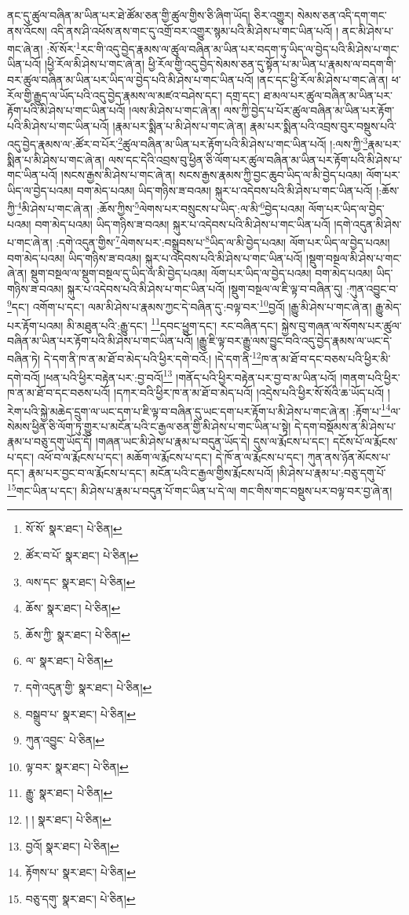 ནང་དུ་ཚུལ་བཞིན་མ་ཡིན་པར་ཐེ་ཚོམ་ཅན་གྱི་ཚུལ་གྱིས་ཅི་ཞིག་ཡོད། ཅིར་འགྱུར། སེམས་ཅན་འདི་དག་གང་ནས་འོངས། འདི་ནས་ཤི་འཕོས་ནས་གང་དུ་འགྲོ་བར་འགྱུར་སྙམ་པའི་མི་ཤེས་པ་གང་ཡིན་པའོ། །
ནང་མི་ཤེས་པ་གང་ཞེ་ན། :སོ་སོར་\footnote{སོ་སོ་  སྣར་ཐང་།  པེ་ཅིན། }རང་གི་འདུ་བྱེད་རྣམས་ལ་ཚུལ་བཞིན་མ་ཡིན་པར་བདག་ཏུ་ཡིད་ལ་བྱེད་པའི་མི་ཤེས་པ་གང་ཡིན་པའོ། །ཕྱི་རོལ་མི་ཤེས་པ་གང་ཞེ་ན། ཕྱི་རོལ་གྱི་འདུ་བྱེད་སེམས་ཅན་དུ་སྟོན་པ་མ་ཡིན་པ་རྣམས་ལ་བདག་གི་བར་ཚུལ་བཞིན་མ་ཡིན་པར་ཡིད་ལ་བྱེད་པའི་མི་ཤེས་པ་གང་ཡིན་པའོ། །ནང་དང་ཕྱི་རོལ་མི་ཤེས་པ་གང་ཞེ་ན། ཕ་རོལ་གྱི་རྒྱུད་ལ་ཡོད་པའི་འདུ་བྱེད་རྣམས་ལ་མཛའ་བཤེས་དང་། དགྲ་དང་། ཐ་མལ་པར་ཚུལ་བཞིན་མ་ཡིན་པར་རྟོག་པའི་མི་ཤེས་པ་གང་ཡིན་པའོ། །ལས་མི་ཤེས་པ་གང་ཞེ་ན། ལས་ཀྱི་བྱེད་པ་པོར་ཚུལ་བཞིན་མ་ཡིན་པར་རྟོག་པའི་མི་ཤེས་པ་གང་ཡིན་པའོ། །རྣམ་པར་སྨིན་པ་མི་ཤེས་པ་གང་ཞེ་ན། རྣམ་པར་སྨིན་པའི་འབྲས་བུར་བསྡུས་པའི་འདུ་བྱེད་རྣམས་ལ་:ཚོར་བ་པོར་\footnote{ཚོར་བ་པོ་  སྣར་ཐང་།  པེ་ཅིན། }ཚུལ་བཞིན་མ་ཡིན་པར་རྟོག་པའི་མི་ཤེས་པ་གང་ཡིན་པའོ། །:ལས་ཀྱི་\footnote{ལས་དང་  སྣར་ཐང་།  པེ་ཅིན། }རྣམ་པར་སྨིན་པ་མི་ཤེས་པ་གང་ཞེ་ན། ལས་དང་དེའི་འབྲས་བུ་ཕྱིན་ཅི་ལོག་པར་ཚུལ་བཞིན་མ་ཡིན་པར་རྟོག་པའི་མི་ཤེས་པ་གང་ཡིན་པའོ། །སངས་རྒྱས་མི་ཤེས་པ་གང་ཞེ་ན། སངས་རྒྱས་རྣམས་ཀྱི་བྱང་ཆུབ་ཡིད་ལ་མི་བྱེད་པའམ། ལོག་པར་ཡིད་ལ་བྱེད་པའམ། བག་མེད་པའམ། ཡིད་གཉིས་ཟ་བའམ། སྐུར་པ་འདེབས་པའི་མི་ཤེས་པ་གང་ཡིན་པའོ། །:ཆོས་ཀྱི་\footnote{ཆོས་  སྣར་ཐང་།  པེ་ཅིན། }མི་ཤེས་པ་གང་ཞེ་ན། :ཆོས་ཀྱིས་\footnote{ཆོས་ཀྱི་  སྣར་ཐང་།  པེ་ཅིན། }ལེགས་པར་བསྲུངས་པ་ཡིད་:ལ་མི་\footnote{ལ་  སྣར་ཐང་།  པེ་ཅིན། }བྱེད་པའམ། ལོག་པར་ཡིད་ལ་བྱེད་པའམ། བག་མེད་པའམ། ཡིད་གཉིས་ཟ་བའམ། སྐུར་པ་འདེབས་པའི་མི་ཤེས་པ་གང་ཡིན་པའོ། །དགེ་འདུན་མི་ཤེས་པ་གང་ཞེ་ན། :དགེ་འདུན་གྱིས་\footnote{དགེ་འདུན་གྱི་  སྣར་ཐང་།  པེ་ཅིན། }ལེགས་པར་:བསྒྲུབས་པ་\footnote{བསྒྲུབ་པ་  སྣར་ཐང་།  པེ་ཅིན། }ཡིད་ལ་མི་བྱེད་པའམ། ལོག་པར་ཡིད་ལ་བྱེད་པའམ། བག་མེད་པའམ། ཡིད་གཉིས་ཟ་བའམ། སྐུར་པ་འདེབས་པའི་མི་ཤེས་པ་གང་ཡིན་པའོ། །སྡུག་བསྔལ་མི་ཤེས་པ་གང་ཞེ་ན། སྡུག་བསྔལ་ལ་སྡུག་བསྔལ་དུ་ཡིད་ལ་མི་བྱེད་པའམ། ལོག་པར་ཡིད་ལ་བྱེད་པའམ། བག་མེད་པའམ། ཡིད་གཉིས་ཟ་བའམ། སྐུར་པ་འདེབས་པའི་མི་ཤེས་པ་གང་ཡིན་པའོ། །སྡུག་བསྔལ་ལ་ཇི་ལྟ་བ་བཞིན་དུ། :ཀུན་འབྱུང་བ་\footnote{ཀུན་འབྱུང་  པེ་ཅིན། }དང་། འགོག་པ་དང་། ལམ་མི་ཤེས་པ་རྣམས་ཀྱང་དེ་བཞིན་དུ་:བལྟ་བར་\footnote{ལྟ་བར་  སྣར་ཐང་།  པེ་ཅིན། }བྱའོ། །རྒྱུ་མི་ཤེས་པ་གང་ཞེ་ན། རྒྱུ་མེད་པར་རྟོག་པའམ། མི་མཐུན་པའི་:རྒྱུ་དང་། \footnote{རྒྱུ་  སྣར་ཐང་།  པེ་ཅིན། }དབང་ཕྱུག་དང་། རང་བཞིན་དང་། སྐྱེས་བུ་གཞན་ལ་སོགས་པར་ཚུལ་བཞིན་མ་ཡིན་པར་རྟོག་པའི་མི་ཤེས་པ་གང་ཡིན་པའོ། །རྒྱུ་ཇི་ལྟ་བར་རྒྱུ་ལས་བྱུང་བའི་འདུ་བྱེད་རྣམས་ལ་ཡང་དེ་བཞིན་ཏེ། དེ་དག་ནི་ཁ་ན་མ་ཐོ་བ་མེད་པའི་ཕྱིར་དགེ་བའོ:། །དེ་དག་ནི་\footnote{། །  སྣར་ཐང་།  པེ་ཅིན། }ཁ་ན་མ་ཐོ་བ་དང་བཅས་པའི་ཕྱིར་མི་དགེ་བའོ། །ཕན་པའི་ཕྱིར་བརྟེན་པར་:བྱ་བའོ།\footnote{བྱའོ།  སྣར་ཐང་།  པེ་ཅིན། } །གནོད་པའི་ཕྱིར་བརྟེན་པར་བྱ་བ་མ་ཡིན་པའོ། །གནག་པའི་ཕྱིར་ཁ་ན་མ་ཐོ་བ་དང་བཅས་པའོ། །དཀར་བའི་ཕྱིར་ཁ་ན་མ་ཐོ་བ་མེད་པའོ། །འདྲེས་པའི་ཕྱིར་སོ་སོའི་ཆ་ཡོད་པའོ། །རེག་པའི་སྐྱེ་མཆེད་དྲུག་ལ་ཡང་དག་པ་ཇི་ལྟ་བ་བཞིན་དུ་ཡང་དག་པར་རྟོག་པ་མི་ཤེས་པ་གང་ཞེ་ན། :རྟོག་པ་\footnote{རྟོགས་པ་  སྣར་ཐང་།  པེ་ཅིན། }ལ་སེམས་ཕྱིན་ཅི་ལོག་ཏུ་གྱུར་པ་མངོན་པའི་ང་རྒྱལ་ཅན་གྱི་མི་ཤེས་པ་གང་ཡིན་པ་སྟེ། དེ་དག་བསྡོམས་ན་མི་ཤེས་པ་རྣམ་པ་བཅུ་དགུ་ཡོད་དོ། །གཞན་ཡང་མི་ཤེས་པ་རྣམ་པ་བདུན་ཡོད་དེ། དུས་ལ་རྨོངས་པ་དང་། དངོས་པོ་ལ་རྨོངས་པ་དང་། འཕོ་བ་ལ་རྨོངས་པ་དང་། མཆོག་ལ་རྨོངས་པ་དང་། དེ་ཁོ་ན་ལ་རྨོངས་པ་དང་། ཀུན་ནས་ཉོན་མོངས་པ་དང་། རྣམ་པར་བྱང་བ་ལ་རྨོངས་པ་དང་། མངོན་པའི་ང་རྒྱལ་གྱིས་རྨོངས་པའོ། །མི་ཤེས་པ་རྣམ་པ་:བཅུ་དགུ་པོ་\footnote{བཅུ་དགུ་  སྣར་ཐང་།  པེ་ཅིན། }གང་ཡིན་པ་དང་། མི་ཤེས་པ་རྣམ་པ་བདུན་པོ་གང་ཡིན་པ་དེ་ལ། གང་གིས་གང་བསྡུས་པར་བལྟ་བར་བྱ་ཞེ་ན། 